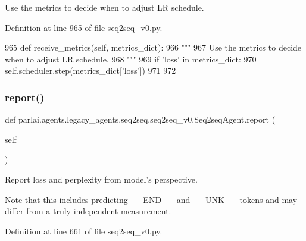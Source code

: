 \begin{DoxyVerb}Use the metrics to decide when to adjust LR schedule.
\end{DoxyVerb}
 

Definition at line 965 of file seq2seq\+\_\+v0.\+py.


\begin{DoxyCode}
965     \textcolor{keyword}{def }receive\_metrics(self, metrics\_dict):
966         \textcolor{stringliteral}{"""}
967 \textcolor{stringliteral}{        Use the metrics to decide when to adjust LR schedule.}
968 \textcolor{stringliteral}{        """}
969         \textcolor{keywordflow}{if} \textcolor{stringliteral}{'loss'} \textcolor{keywordflow}{in} metrics\_dict:
970             self.scheduler.step(metrics\_dict[\textcolor{stringliteral}{'loss'}])
971 
972 
\end{DoxyCode}
\mbox{\label{classparlai_1_1agents_1_1legacy__agents_1_1seq2seq_1_1seq2seq__v0_1_1Seq2seqAgent_a83a444ecb418dfb4381147f23653dd7b}} 
\subsubsection{\texorpdfstring{report()}{report()}}
{\footnotesize\ttfamily def parlai.\+agents.\+legacy\+\_\+agents.\+seq2seq.\+seq2seq\+\_\+v0.\+Seq2seq\+Agent.\+report (\begin{DoxyParamCaption}\item[{}]{self }\end{DoxyParamCaption})}

\begin{DoxyVerb}Report loss and perplexity from model's perspective.

Note that this includes predicting __END__ and __UNK__ tokens and may differ
from a truly independent measurement.
\end{DoxyVerb}
 

Definition at line 661 of file seq2seq\+\_\+v0.\+py.


